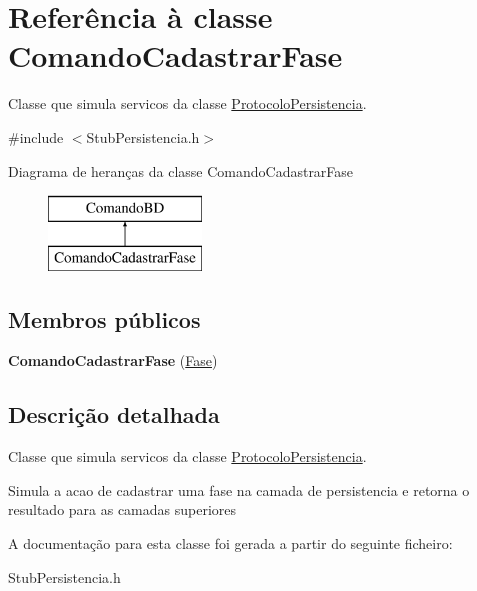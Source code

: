 \hypertarget{class_comando_cadastrar_fase}{
\section{\-Referência à classe \-Comando\-Cadastrar\-Fase}
\label{class_comando_cadastrar_fase}
}


\-Classe que simula servicos da classe \hyperlink{class_protocolo_persistencia}{\-Protocolo\-Persistencia}.  




{\ttfamily \#include $<$\-Stub\-Persistencia.\-h$>$}

\-Diagrama de heranças da classe \-Comando\-Cadastrar\-Fase\begin{figure}[H]
\begin{center}
\leavevmode
\includegraphics[height=2.000000cm]{class_comando_cadastrar_fase}
\end{center}
\end{figure}
\subsection*{\-Membros públicos}
\begin{DoxyCompactItemize}
\item 
\hypertarget{class_comando_cadastrar_fase_ac0ffb6b4c936a5b3a6d2445342dfa101}{
{\bfseries \-Comando\-Cadastrar\-Fase} (\hyperlink{class_fase}{\-Fase})}
\label{class_comando_cadastrar_fase_ac0ffb6b4c936a5b3a6d2445342dfa101}

\end{DoxyCompactItemize}


\subsection{\-Descrição detalhada}
\-Classe que simula servicos da classe \hyperlink{class_protocolo_persistencia}{\-Protocolo\-Persistencia}. 

\-Simula a acao de cadastrar uma fase na camada de persistencia e retorna o resultado para as camadas superiores 

\-A documentação para esta classe foi gerada a partir do seguinte ficheiro\-:\begin{DoxyCompactItemize}
\item 
\-Stub\-Persistencia.\-h\end{DoxyCompactItemize}
